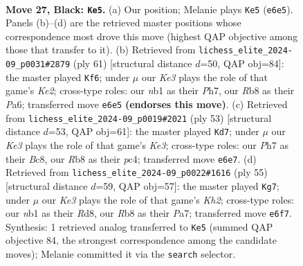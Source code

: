 \documentclass[11pt]{article}
\begin{document}
\clearpage

\begin{figure}[p]\centering
\begin{subfigure}{0.46\textwidth}\centering
\resizebox{\linewidth}{!}{%
\newchessgame
\chessboard[
  setfen={1r5r/7p/1p2k2Q/p4b2/7P/8/PP3PP1/RN4K1 b - - 2 27},
  showmover=false,
  pgfstyle=straightmove, color=movearrow, markmove={e6-e5}
]}
\caption{}
\end{subfigure}\hfill
\begin{subfigure}{0.46\textwidth}\centering
\resizebox{\linewidth}{!}{%
\newchessgame
\chessboard[
  setfen={1r6/1p2k2p/p3r1b1/4bp2/1Q6/8/PP4PP/3R2K1 b - - 7 31},
  showmover=false,
  pgfstyle=straightmove, color=movearrow, markmove={e7-f6}
]}
\caption{}
\end{subfigure}
\\[4pt]
\begin{subfigure}{0.46\textwidth}\centering
\resizebox{\linewidth}{!}{%
\newchessgame
\chessboard[
  setfen={r1b3Q1/ppp5/3pk3/8/2P5/2P1p1P1/P3P2P/6K1 b - - 10 27},
  showmover=false,
  pgfstyle=straightmove, color=movearrow, markmove={e6-d7}
]}
\caption{}
\end{subfigure}\hfill
\begin{subfigure}{0.46\textwidth}\centering
\resizebox{\linewidth}{!}{%
\newchessgame
\chessboard[
  setfen={3r4/pp3P1k/2p5/3r1p1Q/7P/2b5/PPP5/1K5R b - - 0 28},
  showmover=false,
  pgfstyle=straightmove, color=movearrow, markmove={h7-g7}
]}
\caption{}
\end{subfigure}
\caption{\textbf{Move 27, Black: \texttt{Ke5}.} (a) Our position; Melanie plays \texttt{Ke5} (\texttt{e6e5}). Panels (b)--(d) are the retrieved master positions whose correspondence most drove this move (highest QAP objective among those that transfer to it). (b) Retrieved from \texttt{lichess\_elite\_2024-09\_p0031\#2879} (ply 61) [structural distance $d$=50, QAP obj=84]: the master played \texttt{Kf6}; under $\mu$ our \emph{Ke3} plays the role of that game's \emph{Ke2}; cross-type roles: our \emph{n}b1 as their \emph{P}h7, our \emph{R}b8 as their \emph{P}a6; transferred move \texttt{e6e5} \textbf{(endorses this move)}. (c) Retrieved from \texttt{lichess\_elite\_2024-09\_p0019\#2021} (ply 53) [structural distance $d$=53, QAP obj=61]: the master played \texttt{Kd7}; under $\mu$ our \emph{Ke3} plays the role of that game's \emph{Ke3}; cross-type roles: our \emph{P}h7 as their \emph{B}c8, our \emph{R}b8 as their \emph{p}c4; transferred move \texttt{e6e7}. (d) Retrieved from \texttt{lichess\_elite\_2024-09\_p0022\#1616} (ply 55) [structural distance $d$=59, QAP obj=57]: the master played \texttt{Kg7}; under $\mu$ our \emph{Ke3} plays the role of that game's \emph{Kh2}; cross-type roles: our \emph{n}b1 as their \emph{R}d8, our \emph{R}b8 as their \emph{P}a7; transferred move \texttt{e6f7}. Synthesis: 1 retrieved analog transferred to \texttt{Ke5} (summed QAP objective 84, the strongest correspondence among the candidate moves); Melanie committed it via the \texttt{search} selector.}
\label{fig:thought-m53}
\end{figure}
\end{document}
